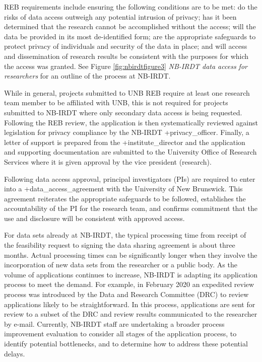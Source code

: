 \documentclass[
]{WileySix}
\begin{document}
REB requirements include ensuring the following conditions are to be met: do the risks of data access outweigh any potential intrusion of privacy; has it been determined that the research cannot be accomplished without the access; will the data be provided in its most de-identified form; are the appropriate safeguards to protect privacy of individuals and security of the data in place; and will access and dissemination of research results be consistent with the purposes for which the access was granted. See Figure \ref{fig:nbirdtfigure3} \emph{NB-IRDT data access for researchers} for an outline of the process at NB-IRDT.

While in general, projects submitted to UNB REB require at least one research team member to be affiliated with UNB, this is not required for projects submitted to NB-IRDT where only secondary data access is being requested. Following the REB review, the application is then systematically reviewed against legislation for privacy compliance by the NB-IRDT +privacy\_officer\textbar. Finally, a letter of support is prepared from the +institute\_director\textbar{} and the application and supporting documentation are submitted to the University Office of Research Services where it is given approval by the vice president (research).

Following data access approval, principal investigators (PIs) are required to enter into a +data\_access\_agreement\textbar{} with the University of New Brunswick. This agreement reiterates the appropriate safeguards to be followed, establishes the accountability of the PI for the research team, and confirms commitment that the use and disclosure will be consistent with approved access.

For data sets already at NB-IRDT, the typical processing time from receipt of the feasibility request to signing the data sharing agreement is about three months. Actual processing times can be significantly longer when they involve the incorporation of new data sets from the researcher or a public body. As the volume of applications continues to increase, NB-IRDT is adapting its application process to meet the demand. For example, in February 2020 an expedited review process was introduced by the Data and Research Committee (DRC) to review applications likely to be straightforward. In this process, applications are sent for review to a subset of the DRC and review results communicated to the researcher by e-mail. Currently, NB-IRDT staff are undertaking a broader process improvement evaluation to consider all stages of the application process, to identify potential bottlenecks, and to determine how to address these potential delays.
\end{document}
